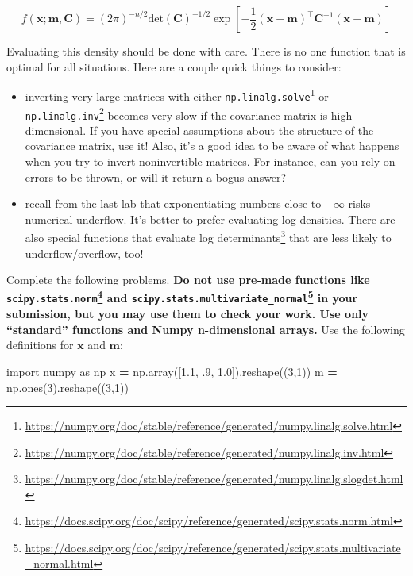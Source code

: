 \documentclass[
  12pt,
  krantz2]{krantz}
\makeatletter
\newenvironment{Shaded}{\begin{snugshade}}{\end{snugshade}}
\newcommand{\DecValTok}[1]{\textcolor[rgb]{0.06,0.06,0.06}{#1}}
\newcommand{\FloatTok}[1]{\textcolor[rgb]{0.06,0.06,0.06}{#1}}
\newcommand{\ImportTok}[1]{#1}
\newcommand{\NormalTok}[1]{#1}
\newcommand{\OperatorTok}[1]{\textcolor[rgb]{0.43,0.43,0.43}{\textbf{#1}}}
\renewcommand{\href}[2]{#2\footnote{\url{#1}}}
\newenvironment{kframe}{%
\medskip{}
\setlength{\fboxsep}{.8em}
 \def\at@end@of@kframe{}%
 \ifinner\ifhmode%
  \def\at@end@of@kframe{\end{minipage}}%
  \begin{minipage}{\columnwidth}%
 \fi\fi%
 \def\FrameCommand##1{\hskip\@totalleftmargin \hskip-\fboxsep
 \colorbox{shadecolor}{##1}\hskip-\fboxsep
     \hskip-\linewidth \hskip-\@totalleftmargin \hskip\columnwidth}%
 \MakeFramed {\advance\hsize-\width
   \@totalleftmargin\z@ \linewidth\hsize
   \@setminipage}}%
 {\par\unskip\endMakeFramed%
 \at@end@of@kframe}
\renewenvironment{Shaded}{\begin{kframe}}{\end{kframe}}
\makeatother
\begin{document}
\[
f(\mathbf{x}; \mathbf{m}, \mathbf{C}) = (2\pi)^{-n/2}\text{det}\left( \mathbf{C} \right)^{-1/2}\exp\left[- \frac{1}{2} (\mathbf{x}- \mathbf{m})^\intercal \mathbf{C}^{-1} (\mathbf{x}- \mathbf{m}) \right]
\]

Evaluating this density should be done with care. There is no one function that is optimal for all situations. Here are a couple quick things to consider:

\begin{itemize}
\item
  inverting very large matrices with either \href{https://numpy.org/doc/stable/reference/generated/numpy.linalg.solve.html}{\texttt{np.linalg.solve}} or \href{https://numpy.org/doc/stable/reference/generated/numpy.linalg.inv.html}{\texttt{np.linalg.inv}} becomes very slow if the covariance matrix is high-dimensional. If you have special assumptions about the structure of the covariance matrix, use it! Also, it's a good idea to be aware of what happens when you try to invert noninvertible matrices. For instance, can you rely on errors to be thrown, or will it return a bogus answer?
\item
  recall from the last lab that exponentiating numbers close to \(-\infty\) risks numerical underflow. It's better to prefer evaluating log densities. There are also \href{https://numpy.org/doc/stable/reference/generated/numpy.linalg.slogdet.html}{special functions that evaluate log determinants} that are less likely to underflow/overflow, too!
\end{itemize}

Complete the following problems. \textbf{Do not use pre-made functions like \href{https://docs.scipy.org/doc/scipy/reference/generated/scipy.stats.norm.html}{\texttt{scipy.stats.norm}} and \href{https://docs.scipy.org/doc/scipy/reference/generated/scipy.stats.multivariate_normal.html}{\texttt{scipy.stats.multivariate\_normal}} in your submission, but you may use them to check your work. Use only ``standard'' functions and Numpy n-dimensional arrays.} Use the following definitions for \(\mathbf{x}\) and \(\mathbf{m}\):

\begin{Shaded}
\begin{Highlighting}[]
\ImportTok{import}\NormalTok{ numpy }\ImportTok{as}\NormalTok{ np}
\NormalTok{x }\OperatorTok{=}\NormalTok{ np.array([}\FloatTok{1.1}\NormalTok{, }\FloatTok{.9}\NormalTok{, }\FloatTok{1.0}\NormalTok{]).reshape((}\DecValTok{3}\NormalTok{,}\DecValTok{1}\NormalTok{))}
\NormalTok{m }\OperatorTok{=}\NormalTok{ np.ones(}\DecValTok{3}\NormalTok{).reshape((}\DecValTok{3}\NormalTok{,}\DecValTok{1}\NormalTok{))}
\end{Highlighting}
\end{Shaded}
\end{document}
